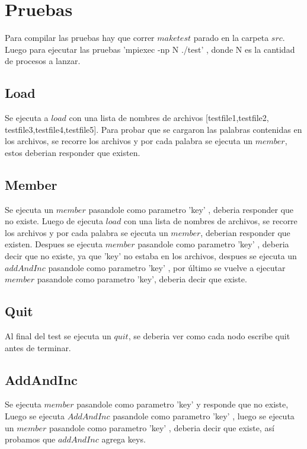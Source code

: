 \section{Pruebas}

Para compilar las pruebas hay que correr $make test$ parado en la carpeta $src$.
Luego para ejecutar las pruebas 'mpiexec -np N ./test' , donde N es la cantidad
de procesos a lanzar.

\subsection{Load}

Se ejecuta a $load$ con una lista de nombres de archivos [testfile1,testfile2,
testfile3,testfile4,testfile5]. Para probar que se cargaron las palabras
contenidas en los archivos, se recorre los archivos y por cada palabra se
ejecuta un $member$, estos deberian responder que existen.

\subsection{Member}

Se ejecuta un $member$ pasandole como parametro 'key' , deberia responder que
no existe. Luego de ejecuta $load$ con una lista de nombres de archivos, se
recorre los archivos y por cada palabra se ejecuta un $member$, deberian
responder que existen. Despues se ejecuta $member$ pasandole como parametro
'key' , deberia decir que no existe, ya que 'key' no estaba en los archivos,
despues se ejecuta un $addAndInc$ pasandole como parametro 'key' , por último
se vuelve a ejecutar $member$ pasandole como parametro 'key', deberia decir
que existe.

\subsection{Quit}

Al final del test se ejecuta un $quit$, se deberia ver como cada nodo escribe
quit antes de terminar.

\subsection{AddAndInc}
Se ejecuta $member$ pasandole como parametro 'key' y responde que
no existe, Luego se ejecuta $AddAndInc$ pasandole como parametro 'key' , luego
se ejecuta un $member$ pasandole como parametro 'key' , deberia decir que
existe, así probamos que $addAndInc$ agrega keys.

